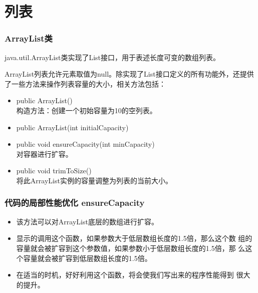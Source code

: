 \section{列表}

\begin{frame}[fragile] %
  \frametitle{ArrayList类}

  java.util.ArrayList类实现了List接口，用于表述长度可变的数组列表。

  ArrayList列表允许元素取值为null。除实现了List接口定义的所有功能外，还提供了一些方法来操作列表容量的大小，相关方法包括：

  \begin{itemize}\kai
  \item public ArrayList()\\构造方法：创建一个初始容量为10的空列表。
  \item public ArrayList(int initialCapacity)
  \item {\Red public void ensureCapacity(int minCapacity)\\对容器进行扩容。}
  \item public void trimToSize() \\将此ArrayList实例的容量调整为列表的当前大小。
  \end{itemize}
\end{frame}

\begin{frame}[fragile]
  \frametitle{代码的局部性能优化 ensureCapacity}


  \begin{itemize}\kai
  \item 该方法可以对ArrayList底层的数组进行扩容。
  \item 显示的调用这个函数，如果参数大于低层数组长度的1.5倍，那么这个数
    组的容量就会被扩容到这个参数值，如果参数小于低层数组长度的1.5倍，那
    么这个容量就会被扩容到低层数组长度的1.5倍。
  \item 在适当的时机，好好利用这个函数，将会使我们写出来的程序性能得到
    很大的提升。
  \end{itemize}

\end{frame}

